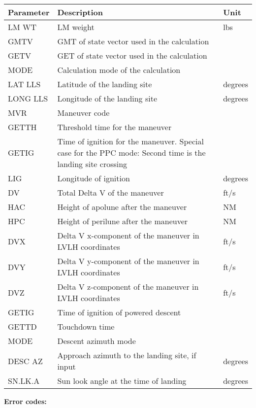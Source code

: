 \documentclass[11pt]{article} %
\begin{document}
\begin{center}
\begin{tabular}{ | m{2cm} | m{9cm} | m{1.5cm} |}
\hline
Parameter&Description&Unit\\
\hline
LM WT&LM weight&lbs\\
\hline
GMTV&GMT of state vector used in the calculation&\\
\hline
GETV&GET of state vector used in the calculation&\\
\hline
MODE&Calculation mode of the calculation&\\
\hline
LAT LLS&Latitude of the landing site&degrees\\
\hline
LONG LLS&Longitude of the landing site&degrees\\
\hline
MVR&Maneuver code&\\
\hline
GETTH&Threshold time for the maneuver&\\
\hline
GETIG&Time of ignition for the maneuver. Special case for the PPC mode: Second time is the landing site crossing&\\
\hline
LIG&Longitude of ignition&degrees\\
\hline
DV&Total Delta V of the maneuver&ft/s\\
\hline
HAC&Height of apolune after the maneuver&NM\\
\hline
HPC&Height of perilune after the maneuver&NM\\
\hline
DVX&Delta V x-component of the maneuver in LVLH coordinates&ft/s\\
\hline
DVY&Delta V y-component of the maneuver in LVLH coordinates&ft/s\\
\hline
DVZ&Delta V z-component of the maneuver in LVLH coordinates&ft/s\\
\hline
GETIG&Time of ignition of powered descent&\\
\hline
GETTD&Touchdown time&\\
\hline
MODE&Descent azimuth mode&\\
\hline
DESC AZ&Approach azimuth to the landing site, if input&degrees\\
\hline
SN.LK.A&Sun look angle at the time of landing&degrees\\
\hline
\end{tabular}
\end{center}
\newpage
\textbf{Error codes:}\\
\end{document}
